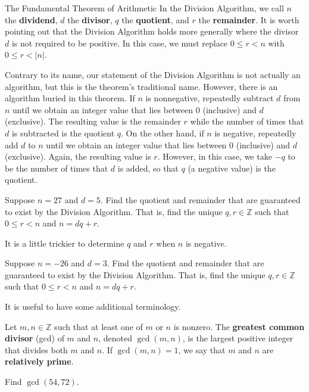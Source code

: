 \begin{section}{The Fundamental Theorem of Arithmetic}
In the Division Algorithm, we call $n$ the \textbf{dividend}, $d$ the \textbf{divisor}, $q$ the \textbf{quotient}, and $r$ the \textbf{remainder}.  It is worth pointing out that the Division Algorithm holds more generally where the divisor $d$ is not required to be positive. In this case, we must replace $0\leq r<n$ with $0\leq r<|n|$. 

Contrary to its name, our statement of the Division Algorithm is not actually an algorithm, but this is the theorem's traditional name. However, there is an algorithm buried in this theorem. If $n$ is nonnegative, repeatedly subtract $d$ from $n$ until we obtain an integer value that lies between 0 (inclusive) and $d$ (exclusive). The resulting value is the remainder $r$ while the number of times that $d$ is subtracted is the quotient $q$. On the other hand, if $n$ is negative, repeatedly add $d$ to $n$ until we obtain an integer value that lies between 0 (inclusive) and $d$ (exclusive). Again, the resulting value is $r$. However, in this case, we take $-q$ to be the number of times that $d$ is added, so that $q$ (a negative value) is the quotient.

\begin{problem}
Suppose $n=27$ and $d=5$. Find the quotient and remainder that are guaranteed to exist by the Division Algorithm.  That is, find the unique $q,r\in\mathbb{Z}$ such that $0\leq r<n$ and $n=dq+r$.
\end{problem}

It is a little trickier to determine $q$ and $r$ when $n$ is negative.

\begin{problem}
Suppose $n=-26$ and $d=3$. Find the quotient and remainder that are guaranteed to exist by the Division Algorithm.  That is, find the unique $q,r\in\mathbb{Z}$ such that $0\leq r<n$ and $n=dq+r$.
\end{problem}

It is useful to have some additional terminology.

\begin{definition}
Let $m,n\in\mathbb{Z}$ such that at least one of $m$ or $n$ is nonzero.  The \textbf{greatest common divisor} (gcd) of $m$ and $n$, denoted $\boxed{\gcd(m,n)}$, is the largest positive integer that divides both $m$ and $n$. If $\gcd(m,n)=1$, we say that $m$ and $n$ are \textbf{relatively prime}.
\end{definition}

\begin{problem}
Find $\gcd(54,72)$.
\end{problem}


\end{section}
